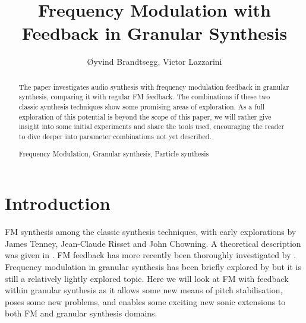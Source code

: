 \documentclass[runningheads,a4paper]{llncs}
\newcommand{\keywords}[1]{\par\addvspace\baselineskip
\noindent\keywordname\enspace\ignorespaces#1}
\begin{document}
\mainmatter  %

\title{Frequency Modulation with Feedback in Granular Synthesis}




\author{\O{}yvind Brandtsegg, Victor Lazzarini}
%




\maketitle

\begin{abstract}

The paper investigates audio synthesis with frequency modulation feedback in granular synthesis, comparing it with regular FM feedback. The combinations if these two classic synthesis techniques show some promising areas of exploration. As a full exploration of this potential is beyond the scope of this paper, we will rather give insight into some initial experiments and share the tools used, encouraging the reader to dive deeper into parameter combinations not yet described.

\keywords{Frequency Modulation, Granular synthesis, Particle synthesis}
\end{abstract}


\section{Introduction}
FM synthesis among the classic synthesis techniques, with early explorations by James Tenney, Jean-Claude Risset and John Chowning. A theoretical description was given in \cite{Chowning-73}. FM feedback has more recently been thoroughly investigated by \cite{Lazzarini-2024}. Frequency modulation in granular synthesis has been briefly explored by \cite{Ervik-Brandtsegg} but it is still a relatively lightly explored topic. Here we will look at FM with feedback within granular synthesis as it allows some new means of pitch stabilisation, poses some new problems, and enables some exciting new sonic extensions to both FM and granular synthesis domains.
\end{document}
